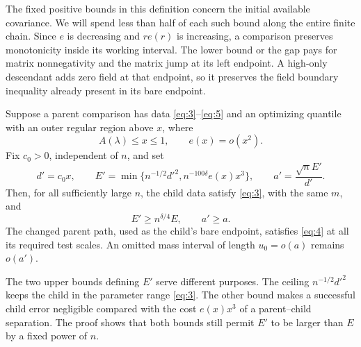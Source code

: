 The fixed positive bounds in this definition concern the initial
available covariance.  We will spend less than half of each such
bound along the entire finite chain.  Since $e$ is decreasing and
$re(r)$ is increasing, a comparison preserves monotonicity inside
its working interval.  The lower bound or the gap pays for matrix
nonnegativity and the matrix jump at its left endpoint.  A high-only
descendant adds zero field at that endpoint, so it preserves the
field boundary inequality already present in its bare endpoint.

\begin{lemma}\label{reg:child-data}
Suppose a parent comparison has data \eqref{eq:3}--\eqref{eq:5} and
an optimizing quantile with an outer regular region above $x$, where
\[
 A(\lambda)\le x\le1,\qquad e(x)=o(x^2).
\]
Fix $c_0>0$, independent of $n$, and set
\[
 d'=c_0x,\qquad
 E'=\min\bigl\{n^{-1/2}d'^2,
                      n^{-100\delta}e(x)x^3\bigr\},\qquad
 a'=\frac{\sqrt n E'}{d'}.
\]
Then, for all sufficiently large $n$, the child data satisfy
\eqref{eq:3}, with the same $m$, and
\[
 E'\ge n^{\delta/4}E,\qquad a'\ge a.
\]
The changed parent path, used as the child's bare endpoint, satisfies
\eqref{eq:4} at all its required test scales.  An omitted mass interval
of length $u_0=o(a)$ remains $o(a')$.
\end{lemma}

The two upper bounds defining $E'$ serve different purposes.  The
ceiling $n^{-1/2}d'^2$ keeps the child in the parameter range
\eqref{eq:3}.  The other bound makes a successful child error
negligible compared with the cost $e(x)x^3$ of a parent--child
separation.  The proof shows that both bounds still permit $E'$ to
be larger than $E$ by a fixed power of $n$.

